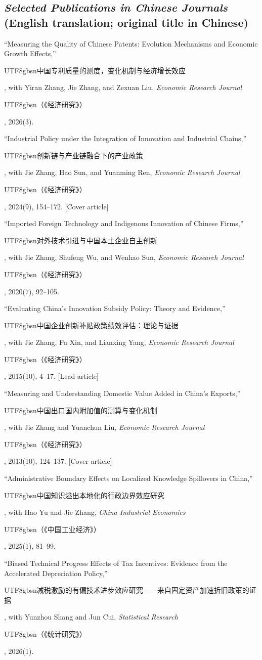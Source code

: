 \documentclass[letterpaper]{article}
\newcommand{\cj}[1]{{\begin{CJK}{UTF8}{gbsn}#1\end{CJK}}}
\begin{document}
\subsection*{\textit{Selected Publications in Chinese Journals} {\normalfont (English translation; original title in Chinese)}}
\begin{papers}
\item ``Measuring the Quality of Chinese Patents: Evolution Mechanisms and Economic Growth Effects,'' \cj{中国专利质量的测度，变化机制与经济增长效应}, with Yiran Zhang, Jie Zhang, and Zexuan Liu, \textit{Economic Research Journal} \cj{（《经济研究》）}, 2026(3).

\item ``Industrial Policy under the Integration of Innovation and Industrial Chains,'' \cj{创新链与产业链融合下的产业政策}, with Jie Zhang, Hao Sun, and Yuanming Ren, \textit{Economic Research Journal} \cj{（《经济研究》）}, 2024(9), 154--172. [Cover article]

\item ``Imported Foreign Technology and Indigenous Innovation of Chinese Firms,'' \cj{对外技术引进与中国本土企业自主创新}, with Jie Zhang, Shufeng Wu, and Wenhao Sun, \textit{Economic Research Journal} \cj{（《经济研究》）}, 2020(7), 92--105.

\item ``Evaluating China's Innovation Subsidy Policy: Theory and Evidence,'' \cj{中国企业创新补贴政策绩效评估：理论与证据}, with Jie Zhang, Fu Xin, and Lianxing Yang, \textit{Economic Research Journal} \cj{（《经济研究》）}, 2015(10), 4--17. [Lead article]

\item ``Measuring and Understanding Domestic Value Added in China's Exports,'' \cj{中国出口国内附加值的测算与变化机制}, with Jie Zhang and Yuanchun Liu, \textit{Economic Research Journal} \cj{（《经济研究》）}, 2013(10), 124--137. [Cover article]

\item ``Administrative Boundary Effects on Localized Knowledge Spillovers in China,'' \cj{中国知识溢出本地化的行政边界效应研究}, with Hao Yu and Jie Zhang, \textit{China Industrial Economics} \cj{（《中国工业经济》）}, 2025(1), 81--99.

\item ``Biased Technical Progress Effects of Tax Incentives: Evidence from the Accelerated Depreciation Policy,'' \cj{减税激励的有偏技术进步效应研究——来自固定资产加速折旧政策的证据}, with Yunzhou Shang and Jun Cui, \textit{Statistical Research} \cj{（《统计研究》）}, 2026(1).


\end{papers}
\end{document}
